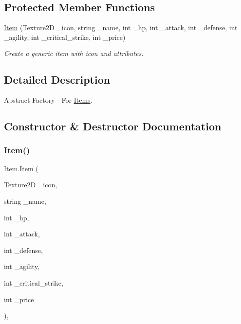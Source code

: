 \subsection*{Protected Member Functions}
\begin{DoxyCompactItemize}
\item 
\mbox{\hyperlink{class_item_ada8a1dc9034f8a956747857f0e4b9e7b}{Item}} (Texture2D \+\_\+icon, string \+\_\+name, int \+\_\+hp, int \+\_\+attack, int \+\_\+defense, int \+\_\+agility, int \+\_\+critical\+\_\+strike, int \+\_\+price)
\begin{DoxyCompactList}\small\item\em Create a generic item with icon and attributes. \end{DoxyCompactList}\end{DoxyCompactItemize}


\subsection{Detailed Description}
Abstract Factory -\/ For \mbox{\hyperlink{class_items}{Items}}. 

\subsection{Constructor \& Destructor Documentation}
\mbox{\label{class_item_ada8a1dc9034f8a956747857f0e4b9e7b}} 
\subsubsection{\texorpdfstring{Item()}{Item()}}
{\footnotesize\ttfamily Item.\+Item (\begin{DoxyParamCaption}\item[{Texture2D}]{\+\_\+icon,  }\item[{string}]{\+\_\+name,  }\item[{int}]{\+\_\+hp,  }\item[{int}]{\+\_\+attack,  }\item[{int}]{\+\_\+defense,  }\item[{int}]{\+\_\+agility,  }\item[{int}]{\+\_\+critical\+\_\+strike,  }\item[{int}]{\+\_\+price }\end{DoxyParamCaption})\hspace{0.3cm}{\ttfamily [inline]}, {\ttfamily [protected]}}




